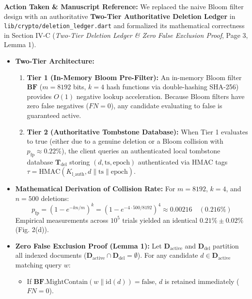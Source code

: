 \documentclass[11pt,a4paper]{article}
\begin{document}
\begin{responsebox}
\textbf{Action Taken \& Manuscript Reference:} We replaced the naive Bloom filter design with an authoritative \textbf{Two-Tier Authoritative Deletion Ledger} in \texttt{lib/crypto/deletion\_ledger.dart} and formalized its mathematical correctness in Section IV-C (\emph{Two-Tier Deletion Ledger \& Zero False Exclusion Proof}, Page 3, Lemma 1).

\begin{itemize}[itemsep=2pt]
    \item \textbf{Two-Tier Architecture:}
    \begin{enumerate}[itemsep=1pt]
        \item \textbf{Tier 1 (In-Memory Bloom Pre-Filter):} An in-memory Bloom filter $\mathbf{BF}$ ($m = 8192$ bits, $k = 4$ hash functions via double-hashing SHA-256) provides $O(1)$ negative lookup acceleration. Because Bloom filters have zero false negatives ($FN=0$), any candidate evaluating to false is guaranteed active.
        \item \textbf{Tier 2 (Authoritative Tombstone Database):} When Tier 1 evaluates to true (either due to a genuine deletion or a Bloom collision with $p_{\text{fp}} \approx 0.22\%$), the client queries an authenticated local tombstone database $\mathbf{T}_{\text{del}}$ storing $(d, \text{ts}, \text{epoch})$ authenticated via HMAC tags $\tau = \text{HMAC}(K_{\text{l\_auth}}, d \parallel \text{ts} \parallel \text{epoch})$.
    \end{enumerate}
    \item \textbf{Mathematical Derivation of Collision Rate:} For $m = 8192$, $k = 4$, and $n = 500$ deletions:
    \begin{equation}
    p_{\text{fp}} = \left(1 - e^{-k n / m}\right)^k = \left(1 - e^{-4 \cdot 500 / 8192}\right)^4 \approx 0.00216 \quad (0.216\%)
    \end{equation}
    Empirical measurements across $10^5$ trials yielded an identical $0.21\% \pm 0.02\%$ (Fig. 2(d)).
    \item \textbf{Zero False Exclusion Proof (Lemma 1):} Let $\mathbf{D}_{\text{active}}$ and $\mathbf{D}_{\text{del}}$ partition all indexed documents ($\mathbf{D}_{\text{active}} \cap \mathbf{D}_{\text{del}} = \emptyset$). For any candidate $d \in \mathbf{D}_{\text{active}}$ matching query $w$:
    \begin{itemize}[itemsep=1pt]
        \item If $\mathbf{BF}.\text{MightContain}(w \parallel \text{id}(d)) = \text{false}$, $d$ is retained immediately ($FN=0$).

\end{itemize}
\end{itemize}
\end{responsebox}
\end{document}
